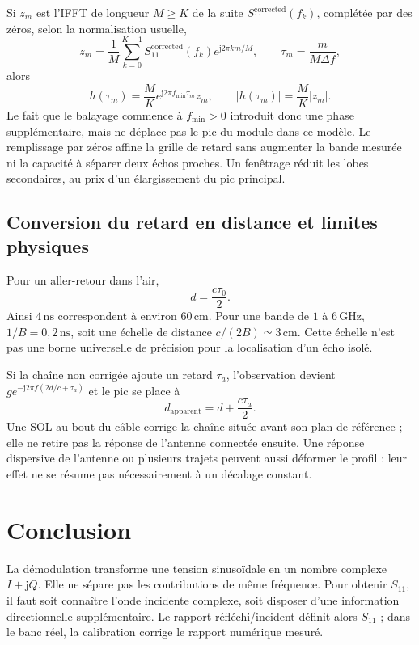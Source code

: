 \documentclass[11pt,a4paper]{article}
\newcommand{\jj}{\mathrm{j}}
\begin{document}
Si $z_m$ est l'IFFT de longueur $M\ge K$ de la suite $S_{11}^{\mathrm{corrected}}(f_k)$, complétée par des
zéros, selon la normalisation usuelle,
\begin{equation}
 z_m=\frac1M\sum_{k=0}^{K-1}S_{11}^{\mathrm{corrected}}(f_k) e^{\jj2\pi km/M},
 \qquad \tau_m=\frac{m}{M\Delta f},
\end{equation}
alors
\begin{equation}
 h(\tau_m)=\frac{M}{K}e^{\jj2\pi f_{\min}\tau_m}z_m,
 \qquad |h(\tau_m)|=\frac{M}{K}|z_m|.
\end{equation}
Le fait que le balayage commence à $f_{\min}>0$ introduit donc une phase
supplémentaire, mais ne déplace pas le pic du module dans ce modèle.
Le remplissage par zéros affine la grille de retard sans augmenter la
bande mesurée ni la capacité à séparer deux échos proches. Un fenêtrage
réduit les lobes secondaires, au prix d'un élargissement du pic principal.

\subsection{Conversion du retard en distance et limites physiques}
Pour un aller-retour dans l'air,
\begin{equation}
 \boxed{d=\frac{c\tau_0}{2}.}
\end{equation}
Ainsi $4\,\mathrm{ns}$ correspondent à environ $60\,\mathrm{cm}$.
Pour une bande de $1$ à $6\,\mathrm{GHz}$, $1/B=0{,}2\,\mathrm{ns}$,
soit une échelle de distance $c/(2B)\simeq3\,\mathrm{cm}$.
Cette échelle n'est pas une borne universelle de précision pour la
localisation d'un écho isolé.

Si la chaîne non corrigée ajoute un retard $\tau_a$, l'observation devient
$g e^{-\jj2\pi f(2d/c+\tau_a)}$ et le pic se place à
\begin{equation}
 d_{\mathrm{apparent}}=d+\frac{c\tau_a}{2}.
\end{equation}
Une SOL au bout du câble corrige la chaîne située avant son plan de
référence ; elle ne retire pas la réponse de l'antenne connectée ensuite.
Une réponse dispersive de l'antenne ou plusieurs trajets peuvent aussi
déformer le profil : leur effet ne se résume pas nécessairement à un
décalage constant.


\section*{Conclusion}
La démodulation transforme une tension sinusoïdale en un nombre complexe
$I+\jj Q$. Elle ne sépare pas les contributions de même fréquence.
Pour obtenir $S_{11}$, il faut soit connaître l'onde incidente complexe,
soit disposer d'une information directionnelle supplémentaire. Le rapport
réfléchi/incident définit alors $S_{11}$ ; dans le banc réel, la calibration
corrige le rapport numérique mesuré.
\end{document}
